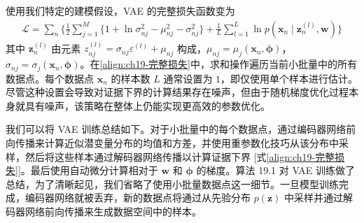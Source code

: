 \documentclass[../../main.tex]{subfiles}
\begin{document}
使用我们特定的建模假设，VAE 的完整损失函数变为
\begin{align}
\mathcal{L}=\sum_{n}\Big\{\frac{1}{2}\sum_{j=1}^{M}\big\{1+\ln\sigma_{nj}^{2}-\mu_{nj}^{2}-\sigma_{nj}^{2}\big\}+\frac{1}{L}\sum_{l=1}^{L}\ln p(\bm{x}_n\mid\bm{z}_n^{(l)},\bm{w})\Big\}
\label{align:ch19-完整损失}
\end{align}
其中 $\bm{z}_n^{(l)}$ 由元素 $z_{nj}^{(l)}=\sigma_{nj}\varepsilon^{(l)}+\mu_{nj}$ 构成，$\mu_{nj}=\mu_j(\bm{x}_n,\bm{\phi})$，$\sigma_{nj}=\sigma_j(\bm{x}_n,\bm{\phi})$。在\eqref{align:ch19-完整损失}中，求和操作遍历当前小批量中的所有数据点。每个数据点 $\bm{x}_n$ 的样本数 $L$ 通常设置为 $1$，即仅使用单个样本进行估计。尽管这种设置会导致对证据下界的计算结果存在噪声，但由于随机梯度优化过程本身就具有噪声，该策略在整体上仍能实现更高效的参数优化。

我们可以将 VAE 训练总结如下。对于小批量中的每个数据点，通过编码器网络前向传播来计算近似潜变量分布的均值和方差，并使用重参数化技巧从该分布中采样，然后将这些样本通过解码器网络传播以计算证据下界 [式\eqref{align:ch19-完整损失}]。最后使用自动微分计算相对于 $\bm{w}$ 和 $\bm{\phi}$ 的梯度。算法 19.1 对 VAE 训练做了总结，为了清晰起见，我们省略了使用小批量数据点这一细节。一旦模型训练完成，编码器网络就被丢弃，新的数据点将通过从先验分布 $p(\bm{z})$ 中采样并通过解码器网络前向传播来生成数据空间中的样本。
\end{document}
